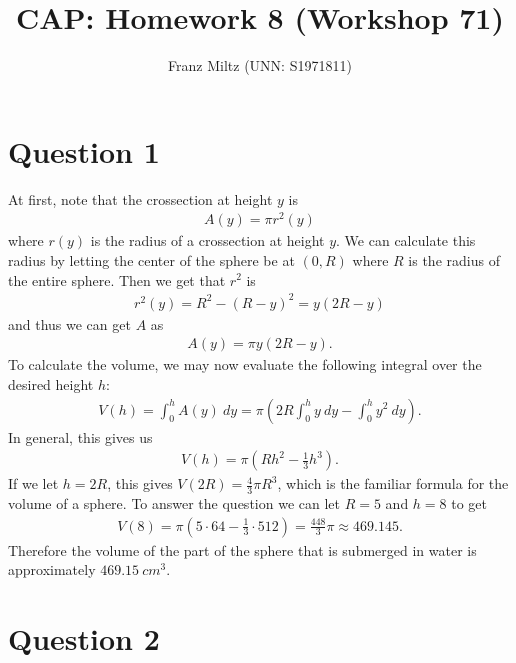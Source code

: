 \documentclass{article}
\title{CAP: Homework 8 (Workshop 71)}
\author{Franz Miltz (UNN: S1971811)}
\begin{document}
\maketitle
\section*{Question 1}
At first, note that the crossection at height $y$ is
\begin{align*}
  A(y) = \pi r^2(y)
\end{align*}
where $r(y)$ is the radius of a crossection at height $y$.
We can calculate this radius by letting the center of the sphere be at $(0, R)$ where $R$ is the radius of the entire sphere.
Then we get that $r^2$ is
\begin{align*}
  r^2(y) = R^2-(R-y)^2 = y(2R-y)
\end{align*}
and thus we can get $A$ as
\begin{align*}
  A(y) = \pi y(2R-y).
\end{align*}
To calculate the volume, we may now evaluate the following integral over the desired height $h$:
\begin{align*}
  V(h)=\int_0^h A(y)\:dy=\pi\left(2R\int_0^h y\:dy - \int_0^h y^2\:dy\right).
\end{align*}
In general, this gives us
\begin{align*}
  V(h)=\pi(Rh^2-\frac{1}{3}h^3).
\end{align*}
If we let $h=2R$, this gives $V(2R)=\frac{4}{3}\pi R^3$, which is the familiar formula for the volume of a sphere.
To answer the question we can let $R=5$ and $h=8$ to get
\begin{align*}
  V(8)=\pi(5\cdot 64-\frac{1}{3}\cdot 512) = \frac{448}{3}\pi\approx 469.145.
\end{align*}
Therefore the volume of the part of the sphere that is submerged in water is approximately $469.15\:cm^3$.
\section*{Question 2}
\end{document}
